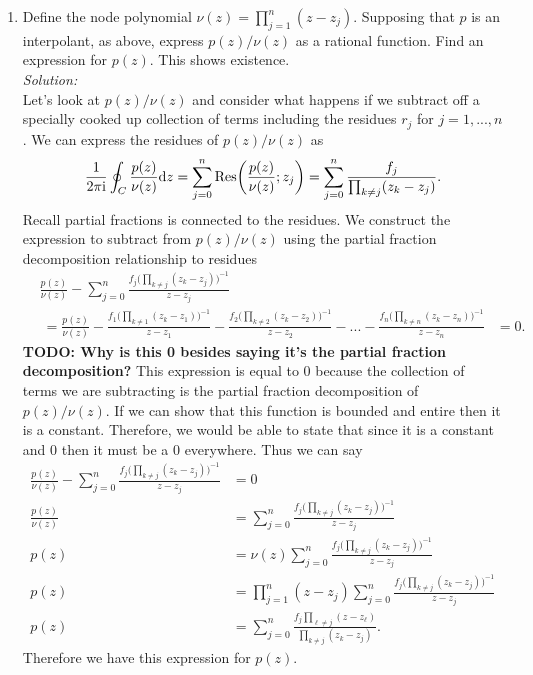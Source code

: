 \documentclass[10pt]{amsart}
\newcommand{\D}{\mathrm{d}}
\newcommand{\I}{\mathrm{i}}
\theoremstyle{nonumberplain}
\begin{document}
\begin{enumerate}[label={\bf {\arabic*}:}]
\begin{enumerate}
\newpage

\item Define the node polynomial $\nu(z) = \prod_{j=1}^n( z - z_j)$.
Supposing that $p$ is an interpolant, as above, express $p(z)/\nu(z)$ as a rational function. 
Find an expression for $p(z)$. This shows existence.\\

\noindent
\textit{Solution:} \\
Let's look at $p(z)/\nu(z)$ and consider what happens if we subtract off a specially cooked up collection of terms including the residues $r_j$ for $j=1, ..., n$.
We can express the residues of $p(z)/\nu(z)$ as
$$
\frac 1 {2 \pi \I} \oint_C \frac {p(z)}{\nu(z)} \D z
	= \sum_{j = 0}^n {\rm Res}\bigg(\frac {p(z)}{\nu(z)}; z_j\bigg)
	= \sum_{j = 0}^n \frac {f_j} {\prod_{k \neq j}( z _k - z_j )}.
$$
Recall partial fractions is connected to the residues.
We construct the expression to subtract from $p(z)/\nu(z)$ using the partial fraction decomposition relationship to residues
\begin{align*}
& \frac {p(z)}{\nu(z)} - \sum_{j = 0}^n \frac {f_j \Big(\prod_{k \neq j}( z _k - z_j )\Big)^{-1}} {z - z_j} \\
	&\: = \frac {p(z)}{\nu(z)}
		- \frac {f_1 \Big(\prod_{k \neq 1}( z _k - z_1 )\Big)^{-1}}{z - z_1}
		- \frac {f_2 \Big(\prod_{k \neq 2}( z _k - z_2 )\Big)^{-1}}{z - z_2} 
		- ...
		- \frac {f_n \Big(\prod_{k \neq n}( z _k - z_n )\Big)^{-1}}{z - z_n}
	&= 0.
\end{align*}
\textbf{TODO: Why is this 0 besides saying it's the partial fraction decomposition?}
This expression is equal to 0 because the collection of terms we are subtracting is the partial fraction decomposition of $p(z)/\nu(z)$.
If we can show that this function is bounded and entire then it is a constant.
Therefore, we would be able to state that since it is a constant and 0 then it must be a 0 everywhere.
Thus we can say
\begin{align*}
\frac {p(z)}{\nu(z)} - \sum_{j = 0}^n \frac {f_j \Big(\prod_{k \neq j}( z _k - z_j )\Big)^{-1}} {z - z_j} &= 0 \\
\frac {p(z)}{\nu(z)} &= \sum_{j = 0}^n \frac {f_j \Big(\prod_{k \neq j}( z _k - z_j )\Big)^{-1}} {z - z_j} \\
p(z) &= \nu(z)\sum_{j = 0}^n \frac {f_j \Big(\prod_{k \neq j}( z _k - z_j )\Big)^{-1}} {z - z_j} \\
p(z) &= \prod_{j=1}^n( z - z_j)\sum_{j = 0}^n \frac {f_j \Big(\prod_{k \neq j}( z _k - z_j )\Big)^{-1}} {z - z_j} \\
p(z) &= \sum_{j = 0}^n \frac {f_j \prod_{\ell \neq j}( z - z_\ell) } {\prod_{k \neq j}( z _k - z_j )}.
\end{align*}
Therefore we have this expression for $p(z)$.
\end{enumerate}


\end{enumerate}
\end{document}
